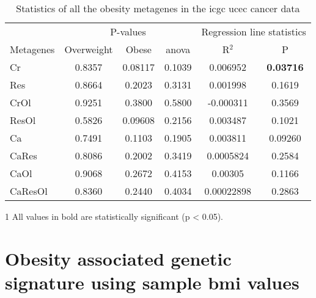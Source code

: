 \begin{appendices}
\begin{table}[htpb]
	\centering
	\caption[Statistics of all the obesity metagenes in the \gls{icgc} \acrshort{ucec} cancer data]{Statistics of all the obesity metagenes in the \gls{icgc} \gls{ucec} cancer data}
	\label{tab:degmetaucec}
	\begin{threeparttable}
		\begin{tabular}{lccccc}
			& \multicolumn{3}{c}{ P-values} & \multicolumn{2}{c}{ Regression line statistics}\\
			\cmidrule(r){2-4} \cmidrule(r){5-6}
			Metagenes &  Overweight &  Obese &  \gls{anova} &  R$^2$ &  P \\
			\hline
			\hline
			\rule{0pt}{2.25ex}Cr      & 0.8357                      & 0.08117 & 0.1039             & 0.006952   & {\bfseries 0.03716}\tnote{1}\\
			Res     & 0.8664                      & 0.2023  & 0.3131             & 0.001998   & 0.1619              \\
			CrOl    & 0.9251                      & 0.3800  & 0.5800             & -0.000311  & 0.3569              \\
			ResOl   & 0.5826                      & 0.09608 & 0.2156             & 0.003487   & 0.1021              \\
			Ca      & 0.7491                      & 0.1103  & 0.1905             & 0.003811   & 0.09260             \\
			CaRes   & 0.8086                      & 0.2002  & 0.3419             & 0.0005824  & 0.2584              \\
			CaOl    & 0.9068                      & 0.2672  & 0.4153             & 0.00305    & 0.1166              \\
			CaResOl & 0.8360                      & 0.2440  & 0.4034             & 0.00022898 & 0.2863              \\
			\hline
			\hline
		\end{tabular}
		\begin{tablenotes}
		\item [1] All values in bold are statistically significant (p \textless{} 0.05).
		\end{tablenotes}
	\end{threeparttable}
\end{table}

	\section{Obesity associated genetic signature using sample \gls{bmi} values}
	\label{sec:obesity_associated_genetic_signature_using_sample_bmi_values}


\end{appendices}
